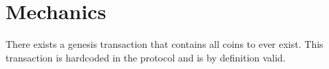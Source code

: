 \section{Mechanics}
  There exists a genesis transaction that contains all coins to ever exist. This transaction is hardcoded in the protocol and is by definition valid.
